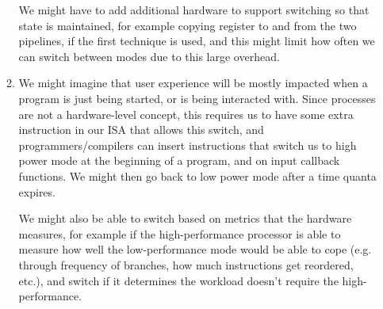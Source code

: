 \begin{enumerate}[label=(\alph*)]
\begin{enumerate}[label=(\roman*)]
                We might have to add additional hardware to support switching so that state is maintained, for example copying register to and from the two pipelines, if the first technique is used, and this might limit how often we can switch between modes due to this large overhead.

            \item
                We might imagine that user experience will be mostly impacted when a program is just being started, or is being interacted with. Since processes are not a hardware-level concept, this requires us to have some extra instruction in our ISA that allows this switch, and programmers/compilers can insert instructions that switch us to high power mode at the beginning of a program, and on input callback functions. We might then go back to low power mode after a time quanta expires.

                We might also be able to switch based on metrics that the hardware measures, for example if the high-performance processor is able to measure how well the low-performance mode would be able to cope (e.g. through frequency of branches, how much instructions get reordered, etc.), and switch if it determines the workload doesn't require the high-performance.





            
        \end{enumerate}

        
    \end{enumerate}

